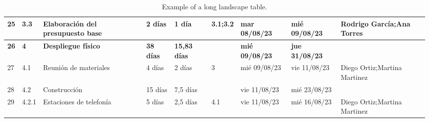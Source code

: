 \begin{landscape}
\begin{table}[p]
\begin{tabular}{|l|l|p{5.5cm}|l|l|l|l|l|p{5.5cm}|}
    25 & 3.3 & Elaboración del presupuesto base & 2 días & 1 día & 3.1;3.2 & mar 08/08/23 & mié 09/08/23 & Rodrigo García;Ana Torres \\ \hline
    \textbf{26} & \textbf{4} & \textbf{Despliegue físico} & \textbf{38 días} & \textbf{15,83 días} & \textbf{} & \textbf{mié 09/08/23} & \textbf{jue 31/08/23} & \textbf{} \\ \hline
    27 & 4.1 & Reunión de materiales & 4 días & 2 días & 3 & mié 09/08/23 & vie 11/08/23 & Diego Ortiz;Martina Martinez \\ \hline
    28 & 4.2 & Construcción & 15 días & 7,5 días &  & vie 11/08/23 & mié 23/08/23 &  \\ \hline
    29 & 4.2.1 & Estaciones de telefonía & 5 días & 2,5 días & 4.1 & vie 11/08/23 & mié 16/08/23 & Diego Ortiz;Martina Martinez \\ \hline
    \end{tabular}%
    \caption{Example of a long landscape table.}
    \label{tab:predecesoras-1}
    \end{table}
\end{landscape}